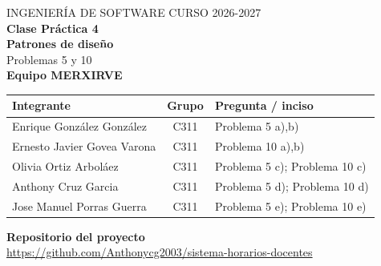 \begin{titlepage}
\thispagestyle{empty}
\centering
{\color{gris}\small\MakeUppercase{Ingeniería de Software \textperiodcentered{} Curso 2026-2027}}\\[10mm]
{\color{azul}\Huge\bfseries Clase Práctica 4\\[2mm] Patrones de diseño}\\[6mm]
{\large Problemas 5 y 10}\\[16mm]
{\color{azul}\LARGE\bfseries Equipo MERXIRVE}\\[12mm]

\renewcommand{\arraystretch}{1.45}
\small
\begin{tabular}{@{}l c p{5.6cm}@{}}
\toprule
\textbf{Integrante} & \textbf{Grupo} & \textbf{Pregunta / inciso} \\
\midrule
Enrique González González   & C311 & Problema 5 a),b) \\
Ernesto Javier Govea Varona & C311 & Problema 10 a),b) \\
Olivia Ortiz Arboláez       & C311 & Problema 5 c); Problema 10 c) \\
Anthony Cruz Garcia         & C311 & Problema 5 d); Problema 10 d) \\
Jose Manuel Porras Guerra   & C311 & Problema 5 e); Problema 10 e) \\
\bottomrule
\end{tabular}
\normalsize

\vspace{14mm}
{\large\bfseries Repositorio del proyecto}\\[3mm]
\url{https://github.com/Anthonycg2003/sistema-horarios-docentes}
\vfill
\end{titlepage}
